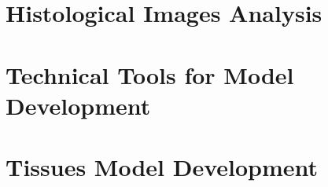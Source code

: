 \documentclass[12pt,a4paper]{report}
\begin{document}

% 


\tableofcontents{}


\clearpage

\chapter{Histological Images Analysis}
    
    
    \clearpage
    
    \clearpage
    
    \clearpage

\chapter{Technical Tools for Model Development} \label{sec:tech_tool}
    
    
    \clearpage

\chapter{Tissues Model Development} \label{sec:models}
    
    
    \clearpage
    
    \clearpage


\clearpage


\end{document}
